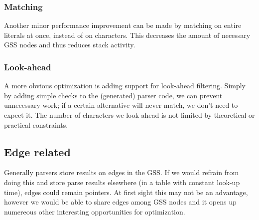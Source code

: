 \documentclass[a4paper,10pt]{article}
\begin{document}
\subsubsection{Matching}
Another minor performance improvement can be made by matching on entire literals at once, instead of on characters. This decreases the amount of necessary GSS nodes and thus reduces stack activity.

\subsubsection{Look-ahead}
A more obvious optimization is adding support for look-ahead filtering. Simply by adding simple checks to the (generated) parser code, we can prevent unnecessary work; if a certain alternative will never match, we don't need to expect it. The number of characters we look ahead is not limited by theoretical or practical constraints.

\subsection{Edge related}

Generally parsers store results on edges in the GSS. If we would refrain from doing this and store parse results elsewhere (in a table with constant look-up time), edges could remain pointers. At first sight this may not be an advantage, however we would be able to share edges among GSS nodes and it opens up numereous other interesting opportunities for optimization.
\end{document}
